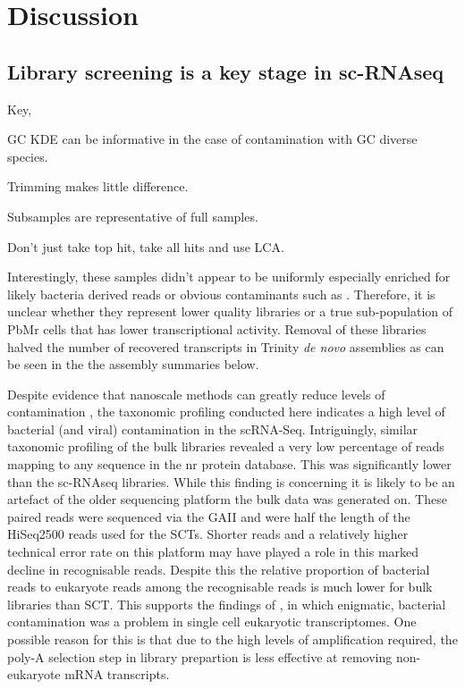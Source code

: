\section{Discussion}

\subsection{Library screening is a key stage in sc-RNAseq}


Key, 

GC KDE can be informative in the case of contamination with GC diverse
species.

Trimming makes little difference.

Subsamples are representative of full samples.

Don't just take top hit, take all hits and use LCA.






Interestingly, these samples didn't appear to be uniformly especially enriched for likely bacteria derived reads or obvious contaminants
such as \citep{Homo sapiens}.  Therefore, it is unclear whether they represent lower quality 
libraries or a true sub-population of PbMr cells that has lower transcriptional activity.
Removal of these libraries halved the number of recovered transcripts in Trinity \textit{de novo} assemblies as can be seen in the the assembly
summaries below.



Despite evidence that nanoscale methods can greatly reduce levels of contamination \citep{Blainey2011}, the taxonomic profiling conducted here
indicates a high level of bacterial (and viral) contamination in the scRNA-Seq.  Intriguingly, similar taxonomic profiling of the bulk
libraries revealed a very low percentage of reads mapping to any sequence in the nr protein database.  This was significantly lower than the
sc-RNAseq libraries.  While this finding is concerning it is likely to be an artefact of the older sequencing platform the bulk data was generated on.
These paired reads were sequenced via the GAII and were half the length of the HiSeq2500 reads used for the SCTs.  Shorter reads and a relatively higher
technical error rate on this platform may have played a role in this marked decline in recognisable reads. 
Despite this the relative proportion of bacterial reads to eukaryote reads among the recognisable reads is much lower for bulk libraries than SCT.
This supports the findings of \citep{Kolisko2014}, in which enigmatic, bacterial contamination was a problem in single cell eukaryotic
transcriptomes.   One possible reason for this is that due to the high levels of amplification required, the poly-A selection step
in library prepartion is less effective at removing non-eukaryote mRNA transcripts.




